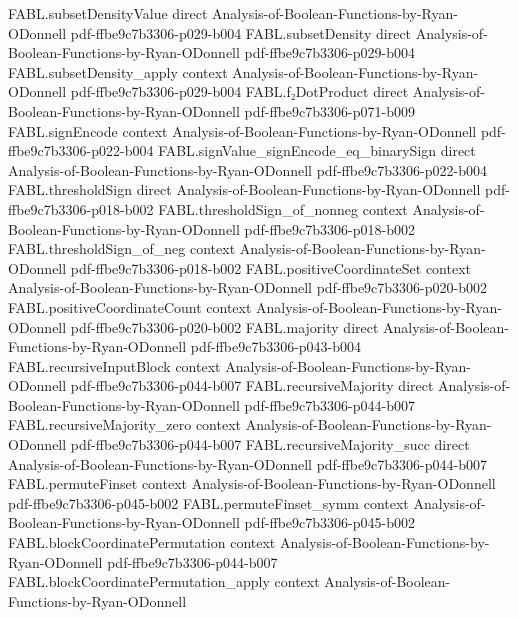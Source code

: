 \begin{theorem}
\proofstep
  {FABL.subsetDensityValue}
  {direct}
  {Analysis-of-Boolean-Functions-by-Ryan-ODonnell}
  {pdf-ffbe9c7b3306-p029-b004}
\proofstep
  {FABL.subsetDensity}
  {direct}
  {Analysis-of-Boolean-Functions-by-Ryan-ODonnell}
  {pdf-ffbe9c7b3306-p029-b004}
\proofstep
  {FABL.subsetDensity_apply}
  {context}
  {Analysis-of-Boolean-Functions-by-Ryan-ODonnell}
  {pdf-ffbe9c7b3306-p029-b004}
\proofstep
  {FABL.f₂DotProduct}
  {direct}
  {Analysis-of-Boolean-Functions-by-Ryan-ODonnell}
  {pdf-ffbe9c7b3306-p071-b009}
\proofstep
  {FABL.signEncode}
  {context}
  {Analysis-of-Boolean-Functions-by-Ryan-ODonnell}
  {pdf-ffbe9c7b3306-p022-b004}
\proofstep
  {FABL.signValue_signEncode_eq_binarySign}
  {direct}
  {Analysis-of-Boolean-Functions-by-Ryan-ODonnell}
  {pdf-ffbe9c7b3306-p022-b004}
\proofstep
  {FABL.thresholdSign}
  {direct}
  {Analysis-of-Boolean-Functions-by-Ryan-ODonnell}
  {pdf-ffbe9c7b3306-p018-b002}
\proofstep
  {FABL.thresholdSign_of_nonneg}
  {context}
  {Analysis-of-Boolean-Functions-by-Ryan-ODonnell}
  {pdf-ffbe9c7b3306-p018-b002}
\proofstep
  {FABL.thresholdSign_of_neg}
  {context}
  {Analysis-of-Boolean-Functions-by-Ryan-ODonnell}
  {pdf-ffbe9c7b3306-p018-b002}
\proofstep
  {FABL.positiveCoordinateSet}
  {context}
  {Analysis-of-Boolean-Functions-by-Ryan-ODonnell}
  {pdf-ffbe9c7b3306-p020-b002}
\proofstep
  {FABL.positiveCoordinateCount}
  {context}
  {Analysis-of-Boolean-Functions-by-Ryan-ODonnell}
  {pdf-ffbe9c7b3306-p020-b002}
\proofstep
  {FABL.majority}
  {direct}
  {Analysis-of-Boolean-Functions-by-Ryan-ODonnell}
  {pdf-ffbe9c7b3306-p043-b004}
\proofstep
  {FABL.recursiveInputBlock}
  {context}
  {Analysis-of-Boolean-Functions-by-Ryan-ODonnell}
  {pdf-ffbe9c7b3306-p044-b007}
\proofstep
  {FABL.recursiveMajority}
  {direct}
  {Analysis-of-Boolean-Functions-by-Ryan-ODonnell}
  {pdf-ffbe9c7b3306-p044-b007}
\proofstep
  {FABL.recursiveMajority_zero}
  {context}
  {Analysis-of-Boolean-Functions-by-Ryan-ODonnell}
  {pdf-ffbe9c7b3306-p044-b007}
\proofstep
  {FABL.recursiveMajority_succ}
  {direct}
  {Analysis-of-Boolean-Functions-by-Ryan-ODonnell}
  {pdf-ffbe9c7b3306-p044-b007}
\proofstep
  {FABL.permuteFinset}
  {context}
  {Analysis-of-Boolean-Functions-by-Ryan-ODonnell}
  {pdf-ffbe9c7b3306-p045-b002}
\proofstep
  {FABL.permuteFinset_symm}
  {context}
  {Analysis-of-Boolean-Functions-by-Ryan-ODonnell}
  {pdf-ffbe9c7b3306-p045-b002}
\proofstep
  {FABL.blockCoordinatePermutation}
  {context}
  {Analysis-of-Boolean-Functions-by-Ryan-ODonnell}
  {pdf-ffbe9c7b3306-p044-b007}
\proofstep
  {FABL.blockCoordinatePermutation_apply}
  {context}
  {Analysis-of-Boolean-Functions-by-Ryan-ODonnell}

\end{theorem}
